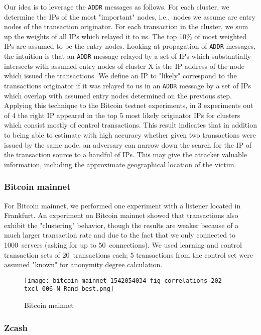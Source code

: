 Our idea is to leverage the \texttt{ADDR} messages as follows.
For each cluster, we determine the IPs of the most "important" nodes, i.e.,~nodes we assume are entry nodes of the transaction originator.
For each transaction in the cluster, we sum up the weights of all IPs which relayed it to us.
The top 10\% of most weighted IPs are assumed to be the entry nodes.
Looking at propagation of \texttt{ADDR} messages, the intuition is that an \texttt{ADDR} message relayed by a set of IPs which substantially intersects with assumed entry nodes of cluster X is the IP address of the node which issued the transactions.
We define an IP to "likely" correspond to the transactions originator if it was relayed to us in an \texttt{ADDR} message by a set of IPs which overlap with assumed entry nodes determined on the previous step.
Applying this technique to the Bitcoin testnet experiments, in 3 experiments out of 4 the right IP appeared in the top 5 most likely originator IPs for clusters which consist mostly of control transactions.
This result indicates that in addition to being able to estimate with high accuracy whether given two transactions were issued by the same node, an adversary can narrow down the search for the IP of the transaction source to a handful of IPs.
This may give the attacker valuable information, including the approximate geographical location of the victim.

\subsubsection{Bitcoin mainnet}

For Bitcoin mainnet, we performed one experiment with a listener located in Frankfurt.
An experiment on Bitcoin mainnet showed that transactions also exhibit the "clustering" behavior, though the results are weaker because of a much larger transaction rate and due to the fact that we only connected to 1000~servers (asking for up to 50~connections).
We used learning and control transaction sets of 20~transactions each; 5 transactions from the control set were assumed "known" for anonymity degree calculation.

\begin{figure}[!t]
	\texttt{[image: bitcoin-mainnet-1542054034\_fig-correlations\_202-txcl\_006-N\_Rand\_best.png]}
	\caption{Bitcoin mainnet}
	\label{fig:bitoin-mainnet}
\end{figure}


\subsubsection{Zcash}

